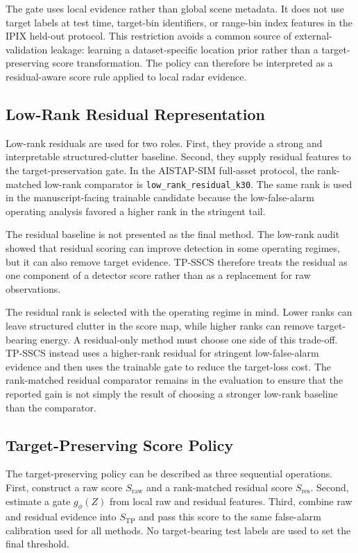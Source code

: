 \documentclass[journal]{IEEEtran}
\begin{document}
The gate uses local evidence rather than global scene metadata. It does not use target labels at test time, target-bin identifiers, or range-bin index features in the IPIX held-out protocol. This restriction avoids a common source of external-validation leakage: learning a dataset-specific location prior rather than a target-preserving score transformation. The policy can therefore be interpreted as a residual-aware score rule applied to local radar evidence.

\subsection{Low-Rank Residual Representation}

Low-rank residuals are used for two roles. First, they provide a strong and interpretable structured-clutter baseline. Second, they supply residual features to the target-preservation gate. In the AISTAP-SIM full-asset protocol, the rank-matched low-rank comparator is \texttt{low\_rank\_residual\_k30}. The same rank is used in the manuscript-facing trainable candidate because the low-false-alarm operating analysis favored a higher rank in the stringent tail.

The residual baseline is not presented as the final method. The low-rank audit showed that residual scoring can improve detection in some operating regimes, but it can also remove target evidence. TP-SSCS therefore treats the residual as one component of a detector score rather than as a replacement for raw observations.

The residual rank is selected with the operating regime in mind. Lower ranks can leave structured clutter in the score map, while higher ranks can remove target-bearing energy. A residual-only method must choose one side of this trade-off. TP-SSCS instead uses a higher-rank residual for stringent low-false-alarm evidence and then uses the trainable gate to reduce the target-loss cost. The rank-matched residual comparator remains in the evaluation to ensure that the reported gain is not simply the result of choosing a stronger low-rank baseline than the comparator.

\subsection{Target-Preserving Score Policy}

The target-preserving policy can be described as three sequential operations. First, construct a raw score $S_{\mathrm{raw}}$ and a rank-matched residual score $S_{\mathrm{res}}$. Second, estimate a gate $g_\phi(Z)$ from local raw and residual features. Third, combine raw and residual evidence into $S_{\mathrm{TP}}$ and pass this score to the same false-alarm calibration used for all methods. No target-bearing test labels are used to set the final threshold.
\end{document}

